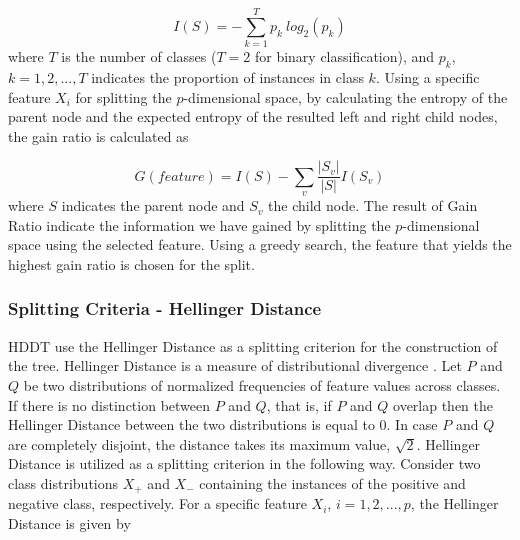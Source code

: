 \documentclass{acm_proc_article-sp}
\begin{document}
\begin{equation*}
	I(S) = -\sum_{k = 1}^{T}p_k \ log_2(p_k)
\end{equation*}
where $T$ is the number of classes ($T=2$ for binary classification), and $p_k$, $k = 1,2,...,T$ indicates the proportion of instances in class $k$. Using a specific feature $X_i$ for splitting the $p$-dimensional space, by calculating the entropy of the parent node and the expected entropy of the resulted left and right child nodes, the gain ratio is calculated as 

\begin{equation*}
	G(feature) = I(S) - \sum_{v}^{}\frac{|S_v|}{|S|}I(S_v)
\end{equation*} 
where $S$ indicates the parent node and $S_v$ the child node. The result of Gain Ratio indicate the information we have gained by splitting the $p$-dimensional space using the selected feature. Using a greedy search, the feature that yields the highest gain ratio is chosen for the split.

\subsubsection{Splitting Criteria - Hellinger Distance}
HDDT use the Hellinger Distance as a splitting criterion for the construction of the tree. Hellinger Distance is a measure of distributional divergence \cite{Cieslak2008}. Let $P$ and $Q$ be two distributions of normalized frequencies of feature values across classes. If there is no distinction between $P$ and $Q$, that is, if $P$ and $Q$ overlap then the Hellinger Distance between the two distributions is equal to 0. In case $P$ and $Q$ are completely disjoint, the distance takes its  maximum value, $\sqrt{2}$. Hellinger Distance is utilized as a splitting criterion in the following way. Consider two class distributions $X_+$ and $X_-$ containing the instances of the positive and negative class, respectively. For a specific feature $X_i$, $i = 1,2,...,p$, the Hellinger Distance is given by 
\end{document}
